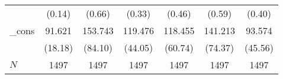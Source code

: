 {\begin{tabular}{l*{6}{c}}
            &                   (0.14)         &                   (0.66)         &                   (0.33)         &                   (0.46)         &                   (0.59)         &                   (0.40)         \\
\_cons      &                   91.621\sym{***}&                  153.743         &                  119.476\sym{**} &                  118.455         &                  141.213         &                   93.574\sym{*}  \\
            &                  (18.18)         &                  (84.10)         &                  (44.05)         &                  (60.74)         &                  (74.37)         &                  (45.56)         \\
\hline
\(N\)       &                     1497         &                     1497         &                     1497         &                     1497         &                     1497         &                     1497         \\
\hline\hline
\end{tabular}
}
